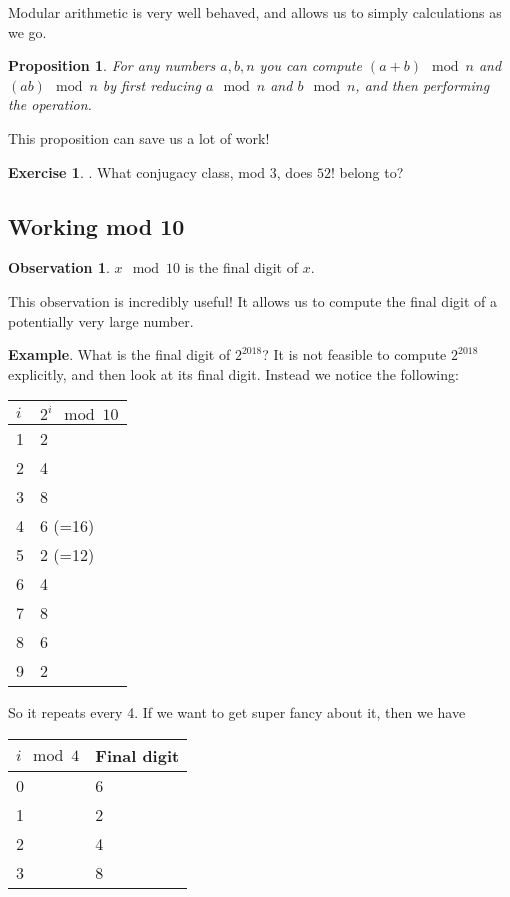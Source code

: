 \documentclass[11pt]{article}
\newtheorem{prop}[thm]{Proposition}
\theoremstyle{definition}
\newtheorem{exercise}{Exercise}
\newtheorem{observation}{Observation}
\numberwithin{thm}{section}
\begin{document}
Modular arithmetic is very well behaved, and allows us to simply calculations as we go.

\begin{prop} For any numbers $a,b,n$ you can compute $(a + b) \mod n$ and $(ab) \mod n$ by first reducing $a \mod n$ and $b \mod n$, and then performing the operation.
\end{prop}

This proposition can save us a lot of work!

\begin{exercise}. What conjugacy class, mod 3, does $52!$ belong to?
\end{exercise}

\subsection{Working mod 10}

\begin{observation} $x \mod 10$ is the final digit of $x$.
\end{observation}

This observation is incredibly useful! It allows us to compute the final digit of a potentially very large number.

\textbf{Example}. What is the final digit of $2^{2018}$? It is not feasible to compute $2^{2018}$ explicitly, and then look at its final digit. Instead we notice the following:

\begin{table}[!ht]
\begin{tabular}{l|l}
$i$ & $2^i \mod 10$ \\ \hline
1   & 2             \\
2   & 4             \\
3   & 8             \\
4   & 6 (=16)       \\
5   & 2 (=12)       \\
6   & 4             \\
7   & 8             \\
8   & 6             \\
9   & 2             \\
\end{tabular}
\end{table}

So it repeats every 4. If we want to get super fancy about it, then we have

\begin{table}[!ht]
\begin{tabular}{l|l}
$i \mod 4$ & Final digit \\ \hline
0          & 6           \\
1          & 2           \\
2          & 4           \\
3          & 8          
\end{tabular}
\end{table}
\end{document}
